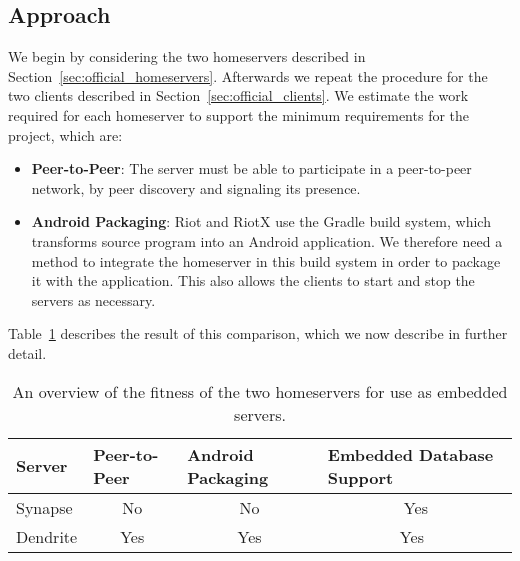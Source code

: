\subsection{Approach}
We begin by considering the two homeservers described in Section~\ref{sec:official_homeservers}.
Afterwards we repeat the procedure for the two clients described in Section~\ref{sec:official_clients}.
We estimate the work required for each homeserver to support the minimum requirements for the project, which are:
\begin{itemize}
	\item{
	      \textbf{Peer-to-Peer}:
	      The server must be able to participate in a peer-to-peer network, by peer discovery and signaling its presence.
	      }
	\item{
	      \textbf{Android Packaging}:
	      Riot and RiotX use the Gradle\cite{gradle} build system, which transforms source program into an Android application.
	      We therefore need a method to integrate the homeserver in this build system in order to package it with the application.
	      This also allows the clients to start and stop the servers as necessary.
	      }
\end{itemize}

Table~\ref{tab:homeserver_comparison} describes the result of this comparison, which we now describe in further detail.

\begin{table}[t]
	\center{}
	\begin{tabular}{lccc}
		\textbf{Server} & \multicolumn{1}{l}{\textbf{Peer-to-Peer}} & \multicolumn{1}{l}{\textbf{Android Packaging}} & \multicolumn{1}{l}{\textbf{Embedded Database Support}} \\ \toprule
		Synapse         & No                                        & No                                             & Yes                                                    \\
		Dendrite        & Yes                                       & Yes                                            & Yes\footnotemark\
	\end{tabular}
	\caption{An overview of the fitness of the two homeservers for use as embedded servers.}%
	\label{tab:homeserver_comparison}
\end{table}

